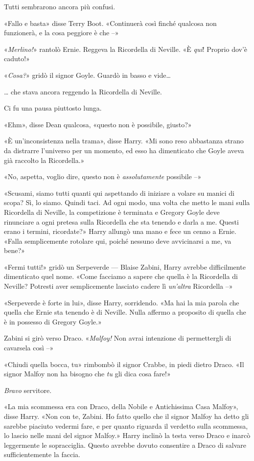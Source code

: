 Tutti sembrarono ancora più confusi.

«Fallo e basta» disse Terry Boot. «Continuerà così finché qualcosa non funzionerà, e la cosa peggiore è che –»

«\textit{Merlino!}» rantolò Ernie. Reggeva la Ricordella di Neville. «È \textit{qui}! Proprio dov’è caduto!»

«\textit{Cosa?}» gridò il signor Goyle. Guardò in basso e vide…

… che stava ancora reggendo la Ricordella di Neville.

Ci fu una pausa piuttosto lunga.

«Ehm», disse Dean qualcosa, «questo non è possibile, giusto?»

«È un’inconsistenza nella trama», disse Harry. «Mi sono reso abbastanza strano da distrarre l’universo per un momento, ed esso ha dimenticato che Goyle aveva già raccolto la Ricordella.»

«No, aspetta, voglio dire, questo non è \textit{assolutamente} possibile –»

«Scusami, siamo tutti quanti qui aspettando di iniziare a volare su manici di scopa? Sì, lo siamo. Quindi taci. Ad ogni modo, una volta che metto le mani sulla Ricordella di Neville, la competizione è terminata e Gregory Goyle deve rinunciare a ogni pretesa sulla Ricordella che sta tenendo e darla a me. Questi erano i termini, ricordate?» Harry allungò una mano e fece un cenno a Ernie. «Falla semplicemente rotolare qui, poiché nessuno deve avvicinarsi a me, va bene?»

«Fermi tutti!» gridò un Serpeverde — Blaise Zabini, Harry avrebbe difficilmente dimenticato quel nome. «Come facciamo a sapere che quella è la Ricordella di Neville? Potresti aver semplicemente lasciato cadere lì \textit{un’altra} Ricordella –»

«Serpeverde è forte in lui», disse Harry, sorridendo. «Ma hai la mia parola che quella che Ernie sta tenendo è di Neville. Nulla affermo a proposito di quella che è in possesso di Gregory Goyle.»

Zabini si girò verso Draco. «\textit{Malfoy!} Non avrai intenzione di permettergli di cavarsela così –»

«Chiudi quella bocca, tu» rimbombò il signor Crabbe, in piedi dietro Draco. «Il signor Malfoy non ha bisogno che \textit{tu} gli dica cosa fare!»

\textit{Bravo} servitore.

«La mia scommessa era con Draco, della Nobile e Antichissima Casa Malfoy», disse Harry. «Non con te, Zabini. Ho fatto quello che il signor Malfoy ha detto gli sarebbe piaciuto vedermi fare, e per quanto riguarda il verdetto sulla scommessa, lo lascio nelle mani del signor Malfoy.» Harry inclinò la testa verso Draco e inarcò leggermente le sopracciglia. Questo avrebbe dovuto consentire a Draco di salvare sufficientemente la faccia.

